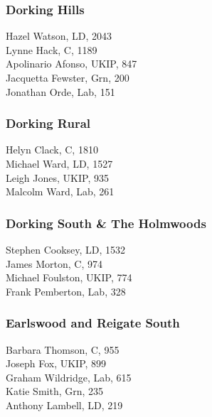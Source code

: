 \documentclass[a4paper,openany,10pt]{book}
\begin{document}
\subsubsection*{Dorking Hills}



Hazel Watson, LD, 2043\\
Lynne Hack, C, 1189\\
Apolinario Afonso, UKIP, 847\\
Jacquetta Fewster, Grn, 200\\
Jonathan Orde, Lab, 151\\


\subsubsection*{Dorking Rural}



Helyn Clack, C, 1810\\
Michael Ward, LD, 1527\\
Leigh Jones, UKIP, 935\\
Malcolm Ward, Lab, 261\\


\subsubsection*{Dorking South \& The Holmwoods}



Stephen Cooksey, LD, 1532\\
James Morton, C, 974\\
Michael Foulston, UKIP, 774\\
Frank Pemberton, Lab, 328\\


\subsubsection*{Earlswood and Reigate South}



Barbara Thomson, C, 955\\
Joseph Fox, UKIP, 899\\
Graham Wildridge, Lab, 615\\
Katie Smith, Grn, 235\\
Anthony Lambell, LD, 219\\
\end{document}
